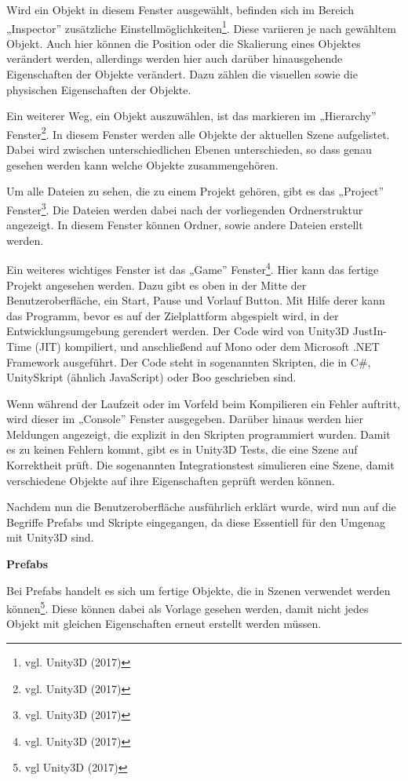 Wird ein Objekt in diesem Fenster ausgewählt, befinden sich im Bereich „Inspector” zusätzliche Einstellmöglichkeiten\footnote{vgl. Unity3D \cite{unity3} (2017)}.
Diese variieren je nach gewähltem Objekt. Auch hier können die Position oder die Skalierung eines Objektes verändert werden, allerdings werden hier auch darüber hinausgehende Eigenschaften der Objekte verändert. Dazu zählen die visuellen sowie die physischen Eigenschaften der Objekte. 

Ein weiterer Weg, ein Objekt auszuwählen, ist das markieren im „Hierarchy” Fenster\footnote{vgl. Unity3D \cite{unity4} (2017)}. 
In diesem Fenster werden alle Objekte der aktuellen Szene aufgelistet. Dabei wird zwischen unterschiedlichen Ebenen unterschieden, so dass genau gesehen werden kann welche Objekte zusammengehören. 

Um alle Dateien zu sehen, die zu einem Projekt gehören, gibt es das „Project” Fenster\footnote{vgl. Unity3D \cite{unity5} (2017)}. Die Dateien werden dabei nach der vorliegenden Ordnerstruktur angezeigt. In diesem Fenster können Ordner, sowie andere Dateien erstellt werden.

Ein weiteres wichtiges Fenster ist das „Game” Fenster\footnote{vgl. Unity3D \cite{unity6} (2017)}. Hier kann das fertige Projekt angesehen werden. Dazu gibt es oben in der Mitte der Benutzeroberfläche, ein Start, Pause und Vorlauf Button. Mit Hilfe derer kann das Programm, bevor es auf der Zielplattform abgespielt wird, in der Entwicklungsumgebung gerendert werden. Der Code wird von Unity3D JustIn-Time (JIT) kompiliert, und anschließend auf Mono oder dem Microsoft .NET Framework ausgeführt. Der Code steht in sogenannten Skripten, die in C\#, UnitySkript (ähnlich JavaScript) oder Boo geschrieben sind.

Wenn während der Laufzeit oder im Vorfeld beim Kompilieren ein Fehler auftritt, wird dieser im „Console” Fenster ausgegeben. Darüber hinaus werden hier Meldungen angezeigt, die explizit in den Skripten programmiert wurden.
Damit es zu keinen Fehlern kommt, gibt es in Unity3D Tests, die eine Szene auf Korrektheit prüft. Die sogenannten Integrationstest simulieren eine Szene, damit verschiedene Objekte auf ihre Eigenschaften geprüft werden können. 

Nachdem nun die Benutzeroberfläche ausführlich erklärt wurde, wird nun auf die Begriffe Prefabs und Skripte eingegangen, da diese Essentiell für den Umgenag mit Unity3D sind.

\textbf{Prefabs}

Bei Prefabs handelt es sich um fertige Objekte, die in Szenen verwendet werden können\footnote{vgl Unity3D \cite{unity7} (2017)}. Diese können dabei als Vorlage gesehen werden, damit nicht jedes Objekt mit gleichen Eigenschaften erneut erstellt werden müssen. 

